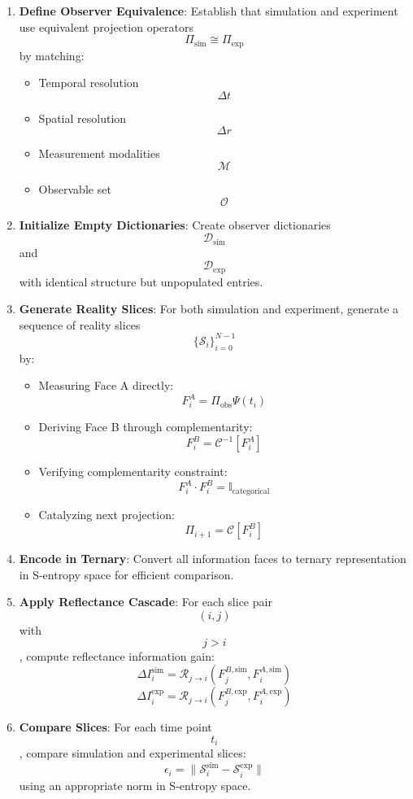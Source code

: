 \documentclass[11pt,twocolumn,a4paper]{article}
\theoremstyle{remark}
\begin{document}
\begin{enumerate}
\item \textbf{Define Observer Equivalence}: Establish that simulation and experiment use equivalent projection operators $$\Pi_{\mathrm{sim}} \cong \Pi_{\mathrm{exp}}$$ by matching:
\begin{itemize}
\item Temporal resolution $$\Delta t$$
\item Spatial resolution $$\Delta r$$
\item Measurement modalities $$\mathcal{M}$$
\item Observable set $$\mathcal{O}$$
\end{itemize}

\item \textbf{Initialize Empty Dictionaries}: Create observer dictionaries $$\mathcal{D}_{\mathrm{sim}}$$ and $$\mathcal{D}_{\mathrm{exp}}$$ with identical structure but unpopulated entries.

\item \textbf{Generate Reality Slices}: For both simulation and experiment, generate a sequence of reality slices $$\{\mathcal{S}_i\}_{i=0}^{N-1}$$ by:
\begin{itemize}
\item Measuring Face A directly: $$F_i^A = \Pi_{\mathrm{obs}} \Psi(t_i)$$
\item Deriving Face B through complementarity: $$F_i^B = \mathcal{C}^{-1}[F_i^A]$$
\item Verifying complementarity constraint: $$F_i^A \cdot F_i^B = \mathbb{I}_{\mathrm{categorical}}$$
\item Catalyzing next projection: $$\Pi_{i+1} = \mathcal{C}[F_i^B]$$
\end{itemize}

\item \textbf{Encode in Ternary}: Convert all information faces to ternary representation in S-entropy space for efficient comparison.

\item \textbf{Apply Reflectance Cascade}: For each slice pair $$(i,j)$$ with $$j > i$$, compute reflectance information gain:
$$
\Delta I_i^{\mathrm{sim}} = \mathcal{R}_{j \to i}(F_j^{B,\mathrm{sim}}, F_i^{A,\mathrm{sim}})
$$
$$
\Delta I_i^{\mathrm{exp}} = \mathcal{R}_{j \to i}(F_j^{B,\mathrm{exp}}, F_i^{A,\mathrm{exp}})
$$

\item \textbf{Compare Slices}: For each time point $$t_i$$, compare simulation and experimental slices:
$$
\epsilon_i = \| \mathcal{S}_i^{\mathrm{sim}} - \mathcal{S}_i^{\mathrm{exp}} \|
$$
using an appropriate norm in S-entropy space.


\end{enumerate}
\end{document}
